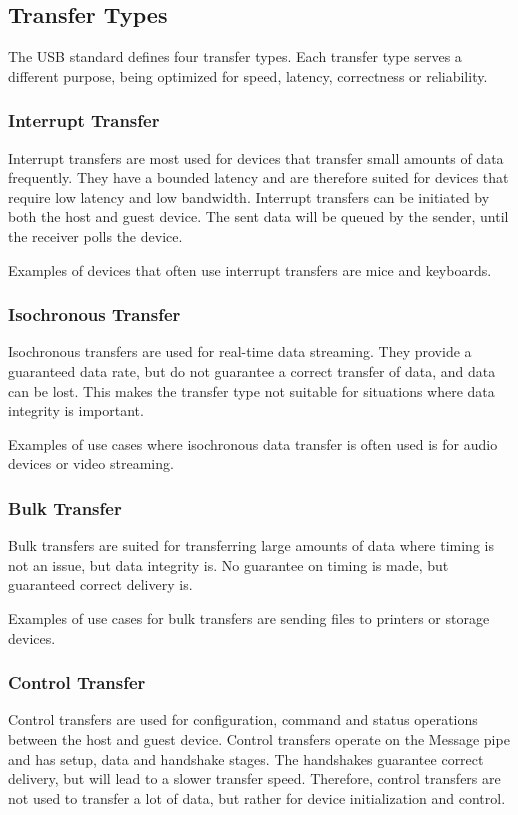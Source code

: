 \subsection{Transfer Types}
\label{section:transfer_types}
The USB standard defines four transfer types. Each transfer type serves a different purpose, being optimized for speed, latency, correctness or reliability.

\subsubsection{Interrupt Transfer}
Interrupt transfers are most used for devices that transfer small amounts of data frequently. They have a bounded latency and are therefore suited for devices that require low latency and low bandwidth. Interrupt transfers can be initiated by both the host and guest device. The sent data will be queued by the sender, until the receiver polls the device.

Examples of devices that often use interrupt transfers are mice and keyboards.

\subsubsection{Isochronous Transfer}
Isochronous transfers are used for real-time data streaming. They provide a guaranteed data rate, but do not guarantee a correct transfer of data, and data can be lost. This makes the transfer type not suitable for situations where data integrity is important.

Examples of use cases where isochronous data transfer is often used is for audio devices or video streaming.

\subsubsection{Bulk Transfer}
Bulk transfers are suited for transferring large amounts of data where timing is not an issue, but data integrity is. No guarantee on timing is made, but guaranteed correct delivery is.

Examples of use cases for bulk transfers are sending files to printers or storage devices.

\subsubsection{Control Transfer}
Control transfers are used for configuration, command and status operations between the host and guest device. Control transfers operate on the Message pipe and has setup, data and handshake stages. The handshakes guarantee correct delivery, but will lead to a slower transfer speed. Therefore, control transfers are not used to transfer a lot of data, but rather for device initialization and control.

